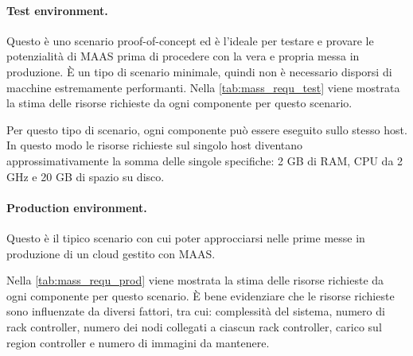 \bigskip
\paragraph{Test environment.}\label{sec:maas_req_test}
Questo è uno scenario proof-of-concept ed è l'ideale per testare e provare le potenzialità di MAAS prima di procedere con la vera e propria messa in produzione.
% 
È un tipo di scenario minimale, quindi non è necessario disporsi di macchine estremamente performanti.
% 
Nella \cref{tab:mass_requ_test} 
viene mostrata la stima delle risorse richieste da ogni componente per questo scenario.



\noindent
Per questo tipo di scenario, ogni componente può essere eseguito sullo stesso host.
% 
In questo modo le risorse richieste sul singolo host diventano approssimativamente la somma delle singole specifiche: 2 GB di RAM, CPU da 2 GHz e 20 GB di spazio su disco.
% 

 

\bigskip
\paragraph{Production environment.}
Questo è il tipico scenario con cui poter approcciarsi nelle prime messe in produzione di un cloud gestito con MAAS.
% 

Nella \cref{tab:mass_requ_prod} 
viene mostrata la stima delle risorse richieste da ogni componente per questo scenario.
% 
È bene evidenziare che le risorse richieste sono influenzate da diversi fattori, tra cui: complessità del sistema, numero di rack controller, numero dei nodi collegati a ciascun rack controller, carico sul region controller e numero di immagini da mantenere.



